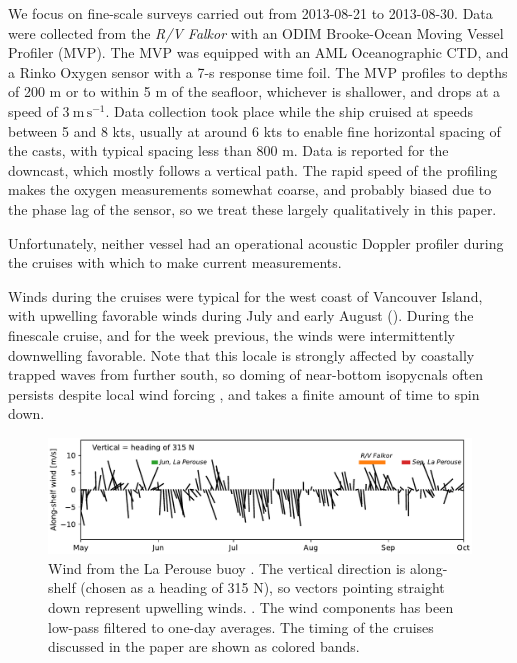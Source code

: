 \documentclass[draft]{agujournal2019}
\begin{document}
We focus on fine-scale surveys carried out from 2013-08-21 to 2013-08-30.  Data were collected from the \emph{R/V Falkor} with an ODIM Brooke-Ocean Moving Vessel Profiler (MVP).  The MVP was equipped with an AML Oceanographic CTD, and a Rinko Oxygen sensor with a 7-s response time foil.  The MVP profiles to depths of 200 m or to within 5 m of the seafloor, whichever is shallower, and drops at a speed of $3\ \mathrm{m\,s^{-1}}$.  Data collection took place while the ship cruised at speeds between 5 and 8 kts, usually at around 6 kts to enable fine horizontal spacing of the casts, with typical spacing less than 800 m.  Data is reported for the downcast, which mostly follows a vertical path.  The rapid speed of the profiling makes the oxygen measurements somewhat coarse, and probably biased due to the phase lag of the sensor, so we treat these largely qualitatively in this paper.

Unfortunately, neither vessel had an operational acoustic Doppler profiler during the cruises with which to make current measurements.

Winds during the cruises were typical for the west coast of Vancouver Island, with upwelling favorable winds during July and early August ().  During the finescale cruise, and for the week previous, the winds were intermittently downwelling favorable.  Note that this locale is strongly affected by coastally trapped waves from further south, so doming of near-bottom isopycnals often persists despite local wind forcing \cite{thomsonkrassovski15, engidaetal16}, and takes a finite amount of time to spin down.

\begin{figure}[htbp]
  \begin{center}
    \includegraphics[width=5.5in]{LaPeWind}
    \caption{
      Wind from the La Perouse buoy \cite{DFOWind2013C46206}.  The vertical direction is along-shelf (chosen as a heading of 315 N), so vectors pointing straight down represent upwelling winds.  .  The wind components has been low-pass filtered to one-day averages.  The timing of the cruises discussed in the paper are shown as colored bands.
      \label{fig:LaPeWind} }
  \end{center}
\end{figure}
\end{document}
